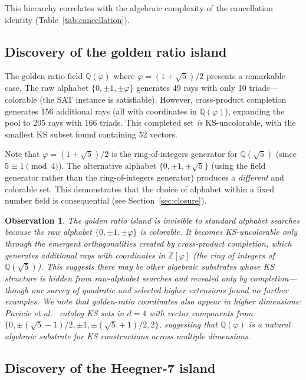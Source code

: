 \documentclass[12pt,a4paper]{article}
\newtheorem{observation}[theorem]{Observation}
\newcommand{\Z}{\mathbb{Z}}
\newcommand{\Q}{\mathbb{Q}}
\begin{document}
This hierarchy correlates with the algebraic complexity of the cancellation identity (Table~\ref{tab:cancellation}).

\subsection{Discovery of the golden ratio island}\label{sec:golden}

The golden ratio field $\Q(\varphi)$ where $\varphi = (1 + \sqrt{5})/2$ presents a remarkable case. The raw alphabet $\{0, \pm 1, \pm\varphi\}$ generates 49 rays with only 10 triads---colorable (the SAT instance is satisfiable). However, cross-product completion generates 156 additional rays (all with coordinates in $\Q(\varphi)$), expanding the pool to 205 rays with 166 triads. This completed set \emph{is} KS-uncolorable, with the smallest KS subset found containing 52 vectors.

Note that $\varphi = (1+\sqrt{5})/2$ is the ring-of-integers generator for $\Q(\sqrt{5})$ (since $5 \equiv 1 \pmod{4}$). The alternative alphabet $\{0, \pm 1, \pm\sqrt{5}\}$ (using the field generator rather than the ring-of-integers generator) produces a \emph{different} and colorable set. This demonstrates that the choice of alphabet within a fixed number field is consequential (see Section~\ref{sec:closure}).

\begin{observation}\label{obs:golden}
The golden ratio island is invisible to standard alphabet searches because the raw alphabet $\{0, \pm 1, \pm\varphi\}$ is colorable. It becomes KS-uncolorable only through the emergent orthogonalities created by cross-product completion, which generates additional rays with coordinates in $\Z[\varphi]$ (the ring of integers of $\Q(\sqrt{5})$). This suggests there may be other algebraic substrates whose KS structure is hidden from raw-alphabet searches and revealed only by completion---though our survey of quadratic and selected higher extensions found no further examples.  We note that golden-ratio coordinates also appear in higher dimensions: Pavicic et al.~\cite{Pavicic2004} catalog KS sets in $d = 4$ with vector components from $\{0, \pm(\sqrt{5}-1)/2, \pm 1, \pm(\sqrt{5}+1)/2, 2\}$, suggesting that $\Q(\varphi)$ is a natural algebraic substrate for KS constructions across multiple dimensions.
\end{observation}

\subsection{Discovery of the Heegner-7 island}\label{sec:heegner}
\end{document}
